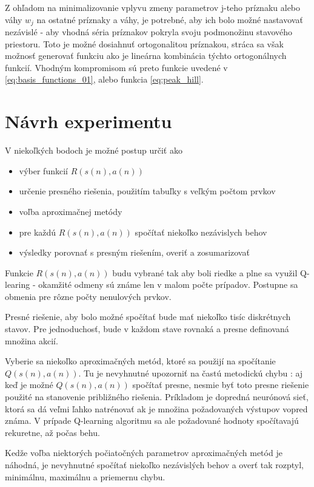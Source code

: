 Z ohľadom na minimalizovanie vplyvu zmeny parametrov j-teho príznaku alebo váhy $w_j$
na ostatné príznaky a váhy, je potrebné, aby ich bolo možné nastavovať nezávislé -
aby vhodná séria príznakov pokryla svoju podmonožinu stavového priestoru. Toto
je možné dosiahnuť ortogonalitou príznakou, stráca sa však možnosť generovať funkciu
ako je lineárna kombinácia týchto ortogonálnych funkcií. Vhodným kompromisom sú
preto funkcie uvedené v \ref{eq:basis_functions_01}, alebo funkcia \ref{eq:peak_hill}.


\section {Návrh experimentu}

V niekoľkých bodoch je možné postup určiť ako

\begin{itemize}
\item výber funkcií $R(s(n), a(n))$
\item určenie presného riešenia, použitím tabuľky s veľkým počtom prvkov
\item voľba aproximačnej metódy
\item pre každú $R(s(n), a(n))$ spočítať niekoľko nezávislych behov
\item výsledky porovnať s presným riešením, overiť a zosumarizovať
\end{itemize}

Funkcie $R(s(n), a(n))$ budu vybrané tak aby boli riedke a plne sa využil Q-learing -
okamžité odmeny sú známe len v malom počte prípadov.
Postupne sa obmenia pre rôzne počty nenulových prvkov.

Presné riešenie, aby bolo možné spočítať bude mať niekoľko tisíc diskrétnych stavov.
Pre jednoduchosť, bude v každom stave rovnaká a presne definovaná množina akcií.

Vyberie sa niekoľko aproximačných metód, ktoré sa použijí na spočítanie $Q(s(n), a(n))$.
Tu je nevyhnutné upozorniť na častú metodickú chybu : aj keď je možné $Q(s(n), a(n))$
spočítať presne, nesmie byť toto presne riešenie použité na stanovenie približného riešenia.
Príkladom je dopredná neurónová sieť, ktorá sa dá veľmi ľahko natrénovať ak je množina požadovaných
výstupov vopred známa. V prípade Q-learning algoritmu sa ale požadované hodnoty spočítavajú
rekuretne, až počas behu.

Kedže voľba niektorých počiatočných parametrov aproximačných metód je náhodná,
je nevyhnutné spočítať niekoľko nezávislých behov a overť tak rozptyl, minimálnu, maximálnu
a priemernu chybu.


